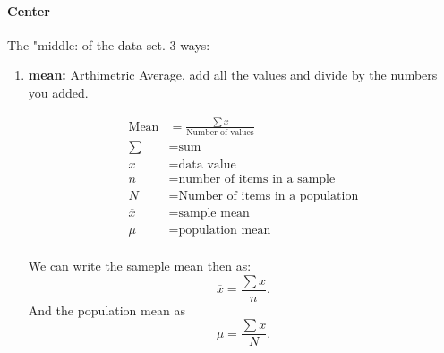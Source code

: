 \documentclass{book}
\begin{document}
\paragraph{Center}  The "middle: of the data set. 3 ways: 
\begin{enumerate}
    \item \textbf{mean:} Arthimetric Average, add all the values and divide by
        the numbers you added.

        \begin{align*}
            \text{Mean} &= \frac{\sum x}{\text{Number of values}} \\
            \sum &= \text{sum} \\
            x &= \text{data value} \\
            n &= \text{number of items in a sample} \\
            N &= \text{Number of items in a population} \\
            \overline{x} &= \text{sample mean} \\
            \mu &= \text{population mean} \\
        \end{align*}

        We can write the sameple mean then as: \[
        \overline{x} = \frac{\sum x}{n} .\] 
        And the population mean as \[
        \mu = \frac{\sum x}{N} .\] 




\end{enumerate}
\end{document}
